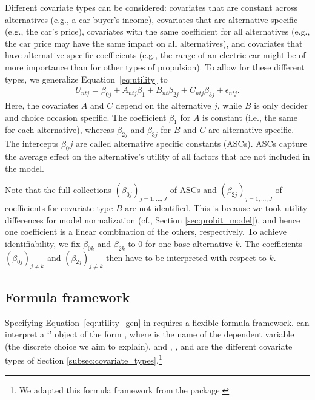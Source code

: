 \documentclass[article,shortnames]{jss}
\newcommand{\class}[1]{`\code{#1}'}
\begin{document}
Different covariate types can be considered: covariates that are constant across alternatives (e.g., a car buyer's income), covariates that are alternative specific (e.g., the car's price), covariates with the same coefficient for all alternatives (e.g., the car price may have the same impact on all alternatives), and covariates that have alternative specific coefficients (e.g., the range of an electric car might be of more importance than for other types of propulsion). To allow for these different types, we generalize Equation~\ref{eq:utility} to
%
\begin{align}
  \label{eq:utility_gen}
  U_{ntj} = \beta_{0j} + A_{ntj} \beta_1 + B_{nt} \beta_{2j} + C_{ntj} \beta_{3j} + \epsilon_{ntj}.
\end{align}
%
Here, the covariates $A$ and $C$ depend on the alternative $j$, while $B$ is only decider and choice occasion specific. The coefficient $\beta_1$ for $A$ is constant (i.e., the same for each alternative), whereas $\beta_{2j}$ and $\beta_{3j}$ for $B$ and $C$ are alternative specific. The intercepts $\beta_0j$ are called alternative specific constants (ASCs). ASCs capture the average effect on the alternative's utility of all factors that are not included in the model.

Note that the full collections $(\beta_{0j})_{j=1,\dots,J}$ of ASCs and $(\beta_{2j})_{j=1,\dots,J}$ of coefficients for covariate type $B$ are not identified. This is because we took utility differences for model normalization (cf., Section \ref{sec:probit_model}), and hence one coefficient is a linear combination of the others, respectively. To achieve identifiability, we fix $\beta_{0k}$ and $\beta_{2k}$ to 0 for one base alternative $k$. The coefficients $(\beta_{0j})_{j\neq k}$ and $(\beta_{2j})_{j\neq k}$ then have to be interpreted with respect to $k$.

\subsection{Formula framework} \label{subsec:formula}

Specifying Equation~\ref{eq:utility_gen} in  requires a flexible formula framework.  can interpret a \class{formula} object of the form , where  is the name of the dependent variable (the discrete choice we aim to explain), and , , and  are the different covariate types of Section \ref{subsec:covariate_types}.\footnote{We adapted this formula framework from the  package.}
\end{document}
